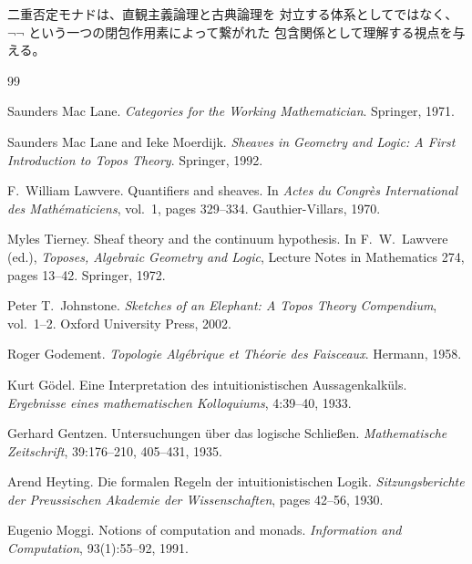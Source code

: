 \documentclass[11pt,a4paper]{article}
\theoremstyle{definition}
\begin{document}
二重否定モナドは、直観主義論理と古典論理を
対立する体系としてではなく、
$\neg\neg$ という一つの閉包作用素によって繋がれた
包含関係として理解する視点を与える。

\begin{thebibliography}{99}

Saunders Mac Lane.
\newblock \emph{Categories for the Working Mathematician}.
\newblock Springer, 1971.

Saunders Mac Lane and Ieke Moerdijk.
\newblock \emph{Sheaves in Geometry and Logic: A First Introduction to Topos Theory}.
\newblock Springer, 1992.

F.\ William Lawvere.
\newblock Quantifiers and sheaves.
\newblock In \emph{Actes du Congr\`{e}s International des Math\'{e}maticiens},
  vol.\ 1, pages 329--334. Gauthier-Villars, 1970.

Myles Tierney.
\newblock Sheaf theory and the continuum hypothesis.
\newblock In F.\ W.\ Lawvere (ed.),
  \emph{Toposes, Algebraic Geometry and Logic},
  Lecture Notes in Mathematics 274, pages 13--42.
  Springer, 1972.

Peter T.\ Johnstone.
\newblock \emph{Sketches of an Elephant: A Topos Theory Compendium}, vol.\ 1--2.
\newblock Oxford University Press, 2002.

Roger Godement.
\newblock \emph{Topologie Alg\'{e}brique et Th\'{e}orie des Faisceaux}.
\newblock Hermann, 1958.

Kurt G\"{o}del.
\newblock Eine Interpretation des intuitionistischen Aussagenkalk\"{u}ls.
\newblock \emph{Ergebnisse eines mathematischen Kolloquiums}, 4:39--40, 1933.

Gerhard Gentzen.
\newblock Untersuchungen \"{u}ber das logische Schlie\ss{}en.
\newblock \emph{Mathematische Zeitschrift}, 39:176--210, 405--431, 1935.

Arend Heyting.
\newblock Die formalen Regeln der intuitionistischen Logik.
\newblock \emph{Sitzungsberichte der Preussischen Akademie der Wissenschaften},
  pages 42--56, 1930.

Eugenio Moggi.
\newblock Notions of computation and monads.
\newblock \emph{Information and Computation}, 93(1):55--92, 1991.

\end{thebibliography}
\end{document}
